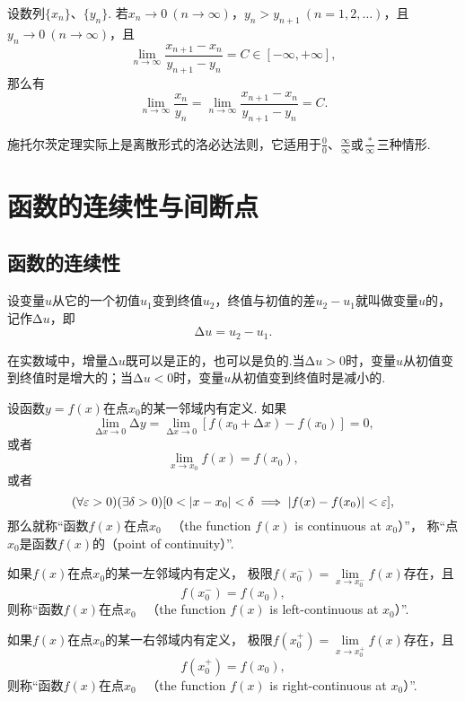 \begin{theorem}[施托尔茨定理II]\label{theorem:极限.施托尔茨定理2}
设数列\(\{x_n\}\)、\(\{y_n\}\).
若\(x_n\to0\ (n\to\infty)\)，\(y_n > y_{n+1}\ (n=1,2,\dotsc)\)，且\(y_n\to0\ (n\to\infty)\)，且\[
\lim\limits_{n\to\infty} \frac{x_{n+1}-x_n}{y_{n+1}-y_n} = C\in[-\infty,+\infty],
\]那么有\[
\lim\limits_{n\to\infty} \frac{x_n}{y_n}
= \lim\limits_{n\to\infty} \frac{x_{n+1}-x_n}{y_{n+1}-y_n}
= C.
\]
\end{theorem}

施托尔茨定理实际上是离散形式的洛必达法则，它适用于\(\frac{0}{0}\)、\(\frac{\infty}{\infty}\)或\(\frac{*}{\infty}\)三种情形.


\section{函数的连续性与间断点}

\subsection{函数的连续性}
\begin{definition}
设变量\(u\)从它的一个初值\(u_1\)变到终值\(u_2\)，终值与初值的差\(u_2 - u_1\)就叫做变量\(u\)的，记作\(\increment u\)，即\[
\increment u = u_2 - u_1.
\]
\end{definition}
在实数域中，增量\(\increment u\)既可以是正的，也可以是负的.当\(\increment u > 0\)时，变量\(u\)从初值变到终值时是增大的；当\(\increment u < 0\)时，变量\(u\)从初值变到终值时是减小的.

\begin{definition}\label{definition:极限.函数在一点的连续性}
设函数\(y=f(x)\)在点\(x_0\)的某一邻域内有定义.
如果\[
	\lim\limits_{\increment x\to0} \increment y
	=\lim\limits_{\increment x\to0} [f(x_0 + \increment x)-f(x_0)]
	=0,
\]
或者\[
	\lim\limits_{x \to x_0} f(x) = f(x_0),
\]
或者\[
	(\forall \varepsilon > 0)
	(\exists \delta > 0)
	[
		0 < \abs{x - x_0} < \delta
		\implies
		\abs{f(x) - f(x_0)} < \varepsilon
	],
\]
那么就称“函数\(f(x)\)在点\(x_0\)~%
（the function \(f(x)\) is continuous at \(x_0\)）”，
称“点\(x_0\)是函数\(f(x)\)的（point of continuity）”.

如果\(f(x)\)在点\(x_0\)的某一左邻域内有定义，
极限\(f(x_0^-) = \lim\limits_{x \to x_0^-} f(x)\)存在，且\[
	f(x_0^-) = f(x_0),
\]
则称“函数\(f(x)\)在点\(x_0\)~%
（the function \(f(x)\) is left-continuous at \(x_0\)）”.

如果\(f(x)\)在点\(x_0\)的某一右邻域内有定义，
极限\(f(x_0^+) = \lim\limits_{x \to x_0^+} f(x)\)存在，且\[
	f(x_0^+) = f(x_0),
\]
则称“函数\(f(x)\)在点\(x_0\)~%
（the function \(f(x)\) is right-continuous at \(x_0\)）”.
\end{definition}

